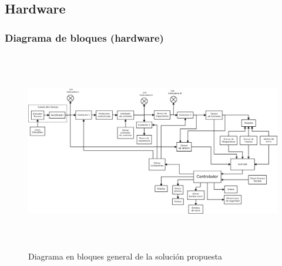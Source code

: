 

%


  \subsection{Hardware}  

  \newpage


  \subsubsection{Diagrama de bloques (hardware)}

\begin{figure}[h!]
 \centering
 \includegraphics[height=330px, angle=90]{../../Documentacion/Diagramas/diagramaBloquesMacro.png}
 \caption{Diagrama en bloques general de la solución propuesta}
\end{figure}



